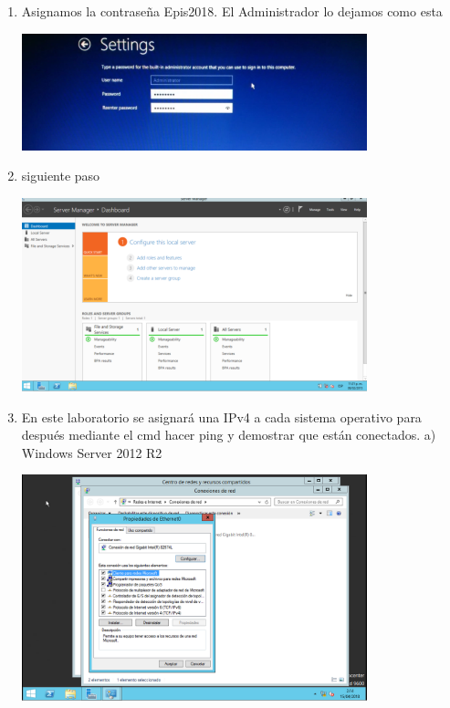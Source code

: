 \begin{enumerate}[1.]
	\item Asignamos la contraseña Epis2018. El Administrador lo dejamos como esta

	\begin{center}
	\includegraphics[width=10cm]{./Imagenes/img8server} 
	\end{center}
	
	\item siguiente paso

	\begin{center}
	\includegraphics[width=10cm]{./Imagenes/img9server} 
	\end{center}

	\hfill \break
	\hfill \break
	\hfill \break
	\hfill \break
	\hfill \break
	\item En este laboratorio se asignará una IPv4 a cada sistema operativo para después mediante el cmd hacer ping y demostrar que están conectados.
	\subitem a)	Windows Server 2012 R2

	\begin{center}
	\includegraphics[width=10cm]{./Imagenes/img10server} 
	\end{center}
	

\end{enumerate}
